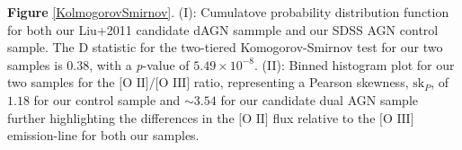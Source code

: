 \label{KolmogorovSmirnov} \textbf{Figure} \ref{KolmogorovSmirnov}. (I): Cumulatove probability distribution function for both our Liu+2011 candidate dAGN sammple and our SDSS AGN control sample. The D statistic for the two-tiered Komogorov-Smirnov test for our two samples is 0.38, with a \textit{p}-value of $5.49\times10^{-8}$. (II): Binned histogram plot for our two samples for the $\text{[O II]}/\text{[O III]}$ ratio, representing a Pearson skewness, $\text{sk}_{P}$, of $1.18$ for our control sample and $\sim{3.54}$ for our candidate dual AGN sample further highlighting the differences in the $\text{[O II]}$ flux relative to the $\text{[O III]}$ emission-line for both our samples.
  
  